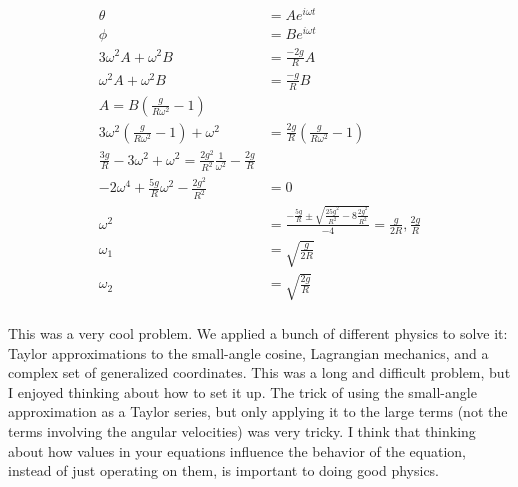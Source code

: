 \documentclass[10pt]{article} %
\begin{document}
\begin{align*}
  \theta &= Ae^{i\omega t}\\
  \phi &= Be^{i\omega t}\\
  3\omega^2A + \omega^2B &= \frac{-2g}{R}A\\
  \omega^2A + \omega^2B &= \frac{-g}{R}B\\
  A = B\left(\frac{g}{R\omega^2}-1\right)\\
  3\omega^2\left(\frac{g}{R\omega^2}-1\right) + \omega^2 &= \frac{2g}{R}\left(\frac{g}{R\omega^2}-1\right)\\
  \frac{3g}{R} - 3\omega^2 + \omega^2 = \frac{2g^2}{R^2}\frac{1}{\omega^2} - \frac{2g}{R}\\
  -2\omega^4 + \frac{5g}{R}\omega^2 - \frac{2g^2}{R^2} &= 0\\
  \omega^2&= \frac{-\frac{5g}{R} \pm \sqrt{\frac{25g^2}{R^2} - 8\frac{2g^2}{R^2}}}{-4} = \frac{g}{2R}, \frac{2g}{R}\\
  \omega_1 &= \sqrt{\frac{g}{2R}}\\
  \omega_2 &= \sqrt{\frac{2g}{R}}\\
\end{align*}

This was a very cool problem. We applied a bunch of different physics to solve it: Taylor approximations to the small-angle cosine, Lagrangian mechanics, and a complex set of generalized coordinates. This was a long and difficult problem, but I enjoyed thinking about how to set it up. The trick of using the small-angle approximation as a Taylor series, but only applying it to the large terms (not the terms involving the angular velocities) was very tricky. I think that thinking about how values in your equations influence the behavior of the equation, instead of just operating on them, is important to doing good physics.\\
\end{document}
